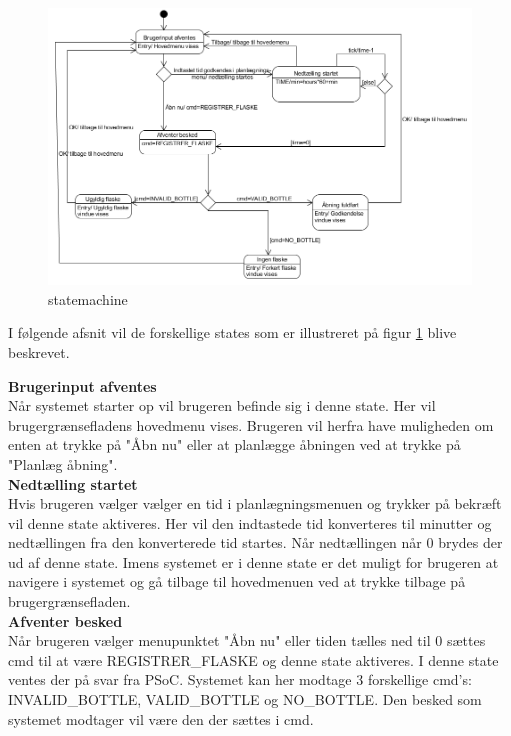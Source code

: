 \begin{figure}[H]
	\centerline{\includegraphics[scale=1]{tex/Design/GUI/Fotos/sm}}
	\caption{statemachine}
	\label{sm}
\end{figure}

I følgende afsnit vil de forskellige states som er illustreret på figur \ref{sm} blive beskrevet.

\textbf{Brugerinput afventes}\\
Når systemet starter op vil brugeren befinde sig i denne state. Her vil brugergrænsefladens hovedmenu vises. Brugeren vil herfra have muligheden om enten at trykke på "Åbn nu" eller at planlægge åbningen ved at trykke på "Planlæg åbning".\\

\textbf{Nedtælling startet}\\
Hvis brugeren vælger vælger en tid i planlægningsmenuen og trykker på bekræft vil denne state aktiveres. Her vil den indtastede tid konverteres til minutter og nedtællingen fra den konverterede tid startes. Når nedtællingen når 0 brydes der ud af denne state. Imens systemet er i denne state er det muligt for brugeren at navigere i systemet og gå tilbage til hovedmenuen ved at trykke tilbage på brugergrænsefladen.\\

\textbf{Afventer besked}\\
Når brugeren vælger menupunktet "Åbn nu" eller tiden tælles ned til 0 sættes cmd til at være REGISTRER_FLASKE og denne state aktiveres. I denne state ventes der på svar fra PSoC. Systemet kan her modtage 3 forskellige cmd's: INVALID_BOTTLE, VALID_BOTTLE og NO_BOTTLE. Den besked som systemet modtager vil være den der sættes i cmd.\\

